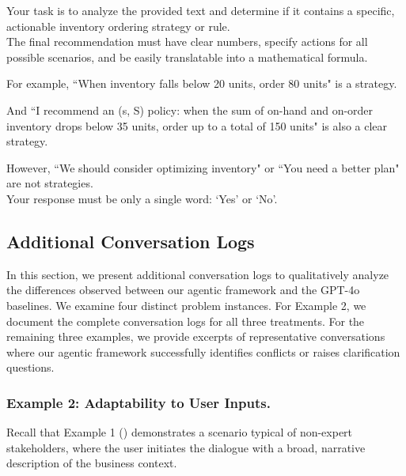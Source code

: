    \begin{table}[h]
    \begin{tcolorbox}
    \scriptsize
    
    Your task is to analyze the provided text and determine if it contains a
    specific, actionable inventory ordering strategy or rule.\\[0pt]

    The final recommendation must have clear numbers, specify actions for all
    possible scenarios, and be easily translatable into a mathematical formula.
    
    For example, ``When inventory falls below 20 units, order 80 units" is a strategy.
    
    And ``I recommend an (s, S) policy: when the sum of on-hand and on-order inventory
    drops below 35 units, order up to a total of 150 units" is also a clear strategy.
    
    However, ``We should consider optimizing inventory" or ``You need a better plan"
    are not strategies.\\[0pt]

    Your response must be only a single word: `Yes' or `No'.
    \end{tcolorbox}
    \caption{System prompt for LLM Judge}
    \label{tab:system_prompt_llm_judge}
    \end{table}

    
\clearpage

\subsection{Additional Conversation Logs}\label{sec:sample_conversation}
In this section, we present additional conversation logs to qualitatively analyze the differences observed between our agentic framework and the GPT-4o baselines. We examine four distinct problem instances. For Example 2, we document the complete conversation logs for all three treatments. For the remaining three examples, we provide excerpts of representative conversations where our agentic framework successfully identifies conflicts or raises clarification questions.


\subsubsection{Example 2: Adaptability to User Inputs.}

Recall that Example 1 () demonstrates a scenario typical of non-expert stakeholders, where the user initiates the dialogue with a broad, narrative description of the business context.

